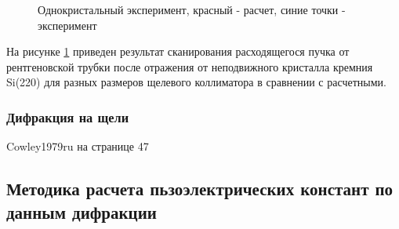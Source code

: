 \begin{figure}[H]
  \centering
  \hfill
  \caption{Однокристальный эксперимент, красный - расчет, синие точки - эксперимент}
  \label{ris:zero_exp}
\end{figure}

На рисунке \ref{ris:zero_exp} приведен результат сканирования расходящегося пучка от рентгеновской
трубки после отражения от неподвижного кристалла кремния Si(220) для разных размеров щелевого коллиматора
в сравнении с расчетными.

   \subsubsection{Дифракция на щели}
      Cowley1979ru на странице 47




\subsection{Методика расчета пьзоэлектрических констант по данным дифракции}

